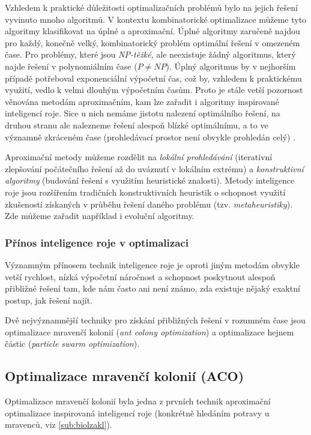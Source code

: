 \documentclass[a4paper,12pt]{article}
\begin{document}
Vzhledem k praktické důležitosti optimalizačních problémů bylo na jejich řešení vyvinuto mnoho
algoritmů. V kontextu kombinatorické optimalizace můžeme tyto algoritmy klasifikovat na úplné a
aproximační. Úplné algoritmy zaručeně najdou pro každý, konečně velký, kombinatorický problém
optimální řešení v omezeném čase. Pro problémy, které jsou {\it NP-těžké}, ale neexistuje žádný
algoritmus, který najde řešení v polynomiálním čase ($P\neq NP$). Úplný algoritmus by v nejhorším
případě potřeboval exponenciální výpočetní čas, což by, vzhledem k praktickému využití, vedlo k
velmi dlouhým výpočetním časům. Proto je stále vetší pozornost věnována metodám aproximačním, kam
lze zařadit i algoritmy inspirované inteligencí roje. Sice u nich nemáme jistotu nalezení
optimálního řešení, na druhou stranu ale nalezneme řešení alespoň blízké optimálnímu, a to ve
významně zkráceném čase (prohledávací prostor není obvykle prohledán celý) \cite{Blum08SwarmOpt}.

Aproximační metody můžeme rozdělit na {\it lokální prohledávání} (iterativní zlepšování počátečního
řešení až do uváznutí v lokálním extrému) a {\it konstruktivní algoritmy} (budování řešení s využitím
heuristické znalosti). Metody inteligence roje jsou rozšířením tradičních konstruktivních heuristik o
schopnost využití zkušeností získaných v průběhu řešení daného problému (tzv. {\it metaheuristiky}).
Zde můžeme zařadit například i evoluční algoritmy. %

\subsubsection{Přínos inteligence roje v optimalizaci}

Významným přínosem technik inteligence roje je oproti jiným metodám obvykle vetší rychlost, nízká
výpočetní náročnost a schopnost poskytnout alespoň přibližné řešení tam, kde nám často ani není známo,
zda existuje nějaký exaktní postup, jak řešení najít. %


Dvě nejvýznamnější techniky pro získání přibližných řešení v rozumném čase jsou optimalizace mravenčí
kolonií ({\it ant colony optimization}) a optimalizace hejnem částic ({\it particle swarm optimization}).


\subsection{Optimalizace mravenčí kolonií (ACO)}
Optimalizace mravenčí kolonií byla jedna z prvních technik aproximační optimalizace inspirovaná
inteligencí roje (konkrétně hledáním potravy u mravenců, viz \ref{sub:biolzakl}).
\end{document}
